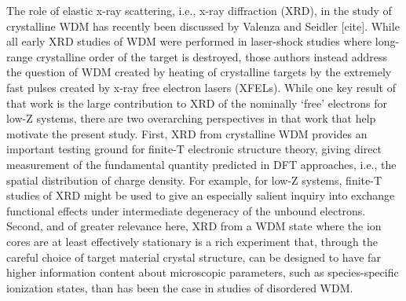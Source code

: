The role of elastic x-ray scattering, i.e., x-ray diffraction (XRD), in
the study of crystalline WDM has recently been discussed by Valenza and
Seidler {[}cite{]}. While all early XRD studies of WDM were performed in
laser-shock studies where long-range crystalline order of the target is
destroyed, those authors instead address the question of WDM created by
heating of crystalline targets by the extremely fast pulses created by
x-ray free electron lasers (XFELs). While one key result of that work is
the large contribution to XRD of the nominally `free' electrons for
low-Z systems, there are two overarching perspectives in that work that
help motivate the present study. First, XRD from crystalline WDM
provides an important testing ground for finite-T electronic structure
theory, giving direct measurement of the fundamental quantity predicted
in DFT approaches, i.e., the spatial distribution of charge density. For
example, for low-Z systems, finite-T studies of XRD might be used to
give an especially salient inquiry into exchange functional effects
under intermediate degeneracy of the unbound electrons. Second, and of
greater relevance here, XRD from a WDM state where the ion cores are at
least effectively stationary is a rich experiment that, through the
careful choice of target material crystal structure, can be designed to
have far higher information content about microscopic parameters, such
as species-specific ionization states, than has been the case in studies
of disordered WDM.

